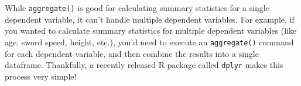 \documentclass{tufte-book}\usepackage[]{graphicx}\usepackage[]{color}
\begin{document}
\begin{footnotesize}
\begin{footnotesize}
\end{footnotesize}

% 
% 
%      
% 
% 
% 
% 
% 
% 


While \texttt{aggregate()} is good for calculating summary statistics for a single dependent variable, it can't handle multiple dependent variables. For example, if you wanted to calculate summary statistics for multiple dependent variables (like age, sword speed, height, etc.), you'd need to execute an \texttt{aggregate()} command for each dependent variable, and then combine the results into a single dataframe. Thankfully, a recently released R package called \texttt{dplyr} makes this process very simple!


\end{footnotesize}
\end{document}

